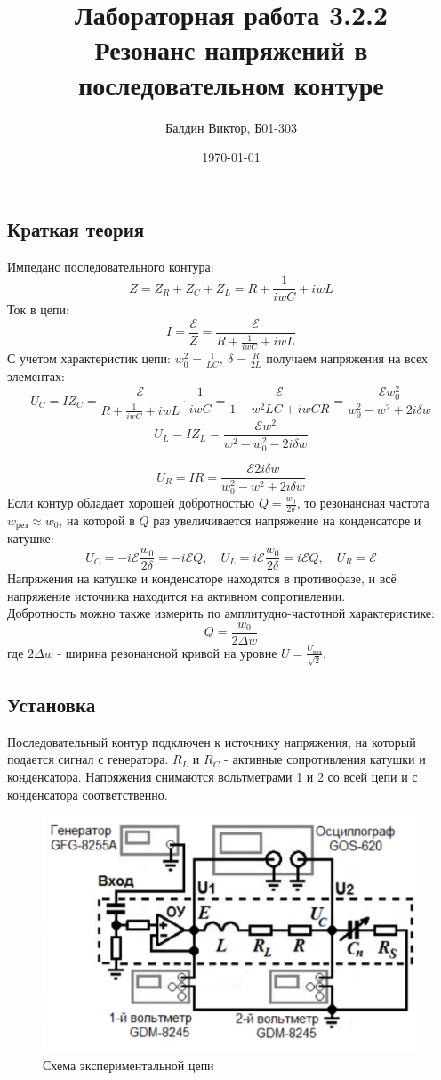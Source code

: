\documentclass[a4paper, 12pt]{article}
\title{Лабораторная работа 3.2.2 \\ Резонанс напряжений в последовательном контуре}
\author{Балдин Виктор, Б01-303}
\date{\today}
\newcommand{\E}{\mathcal{E}}
\begin{document}
	\maketitle
	\subsection*{Краткая теория}
	Импеданс последовательного контура:
	\[Z = Z_R + Z_C + Z_L = R + \frac{1}{iwC} + iwL\]
	Ток в цепи:
	\[I = \frac{\E}{Z} = \frac{\E}{R + \frac{1}{iwC} + iwL}\]
	С учетом характеристик цепи: $w_0^2 = \frac{1}{LC}, \ \delta = \frac{R}{2L}$ получаем напряжения на всех элементах:
	\[U_C = IZ_C = \frac{\E}{R + \frac{1}{iwC} + iwL} \cdot \frac{1}{iwC} = \frac{\E}{1 - w^2LC + iwCR} = \frac{\E w_0^2}{w_0^2 - w^2 + 2i\delta w}\]
	\[U_L = IZ_L = \frac{\E w^2}{w^2 - w_0^2 - 2i\delta w}\]

	\[U_R = IR = \frac{\E 2i\delta w}{w_0^2 - w^2 + 2i\delta w}\]
	Если контур обладает хорошей добротностью $Q = \frac{w_0}{2\delta}$, то резонансная частота $w_\text{рез} \approx w_0$, на которой в $Q$ раз увеличивается напряжение на конденсаторе и катушке:
	\[U_C = -i\E \frac{w_0}{2\delta} = -i\E Q, \quad U_L = i\E \frac{w_0}{2\delta} = i\E Q, \quad U_R = \E \]
	Напряжения на катушке и конденсаторе находятся в противофазе, и всё напряжение источника находится на активном сопротивлении.\\
	Добротность можно также измерить по амплитудно-частотной характеристике: \[Q = \frac{w_0}{2\Delta w}\] где $2\Delta w$ - ширина резонансной кривой на уровне $U = \frac{U_{\text{рез}}}{\sqrt{2}}$.

	\subsection*{Установка}
	Последовательный контур подключен к источнику напряжения, на который подается сигнал с генератора.
	$R_L$ и $R_C$ - активные сопротивления катушки и конденсатора. Напряжения снимаются вольтметрами 1 и 2 со всей цепи и с конденсатора соответственно.
	\begin{figure}[h!]
		\centering
		\includegraphics[width = \textwidth]{Цепь}
		\caption{Схема экспериментальной цепи}
	\end{figure}
	\newpage
\end{document}
